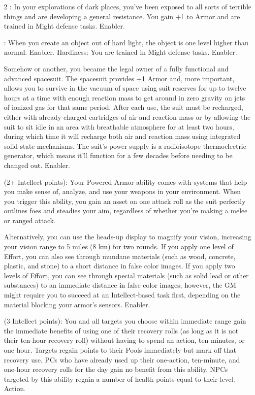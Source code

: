 \begin{multicols}{2}
: In your explorations of dark places, you’ve been exposed to all sorts of terrible things and are developing a general resistance. You gain +1 to Armor and are trained in Might defense tasks. Enabler. 
 
: When you create an object out of hard light, the object is one level higher than normal. Enabler.
Hardiness: You are trained in Might defense tasks. Enabler.
 
 Somehow or another, you became the legal owner of a fully functional and advanced spacesuit. The spacesuit provides +1 Armor and, more important, allows you to survive in the vacuum of space using suit reserves for up to twelve hours at a time with enough reaction mass to get around in zero gravity on jets of ionized gas for that same period. After each use, the suit must be recharged, either with already-charged cartridges of air and reaction mass or by allowing the suit to sit idle in an area with breathable atmosphere for at least two hours, during which time it will recharge both air and reaction mass using integrated solid state mechanisms. The suit’s power supply is a radioisotope thermoelectric generator, which means it’ll function for a few decades before needing to be changed out. Enabler.
 
 (2+ Intellect points): Your Powered Armor ability comes with systems that help you make sense of, analyze, and use your weapons in your environment. When you trigger this ability, you gain an asset on one attack roll as the suit perfectly outlines foes and steadies your aim, regardless of whether you’re making a melee or ranged attack. 

Alternatively, you can use the heads-up display to magnify your vision, increasing your vision range to 5 miles (8 km) for two rounds. If you apply one level of Effort, you can also see through mundane materials (such as wood, concrete, plastic, and stone) to a short distance in false color images. If you apply two levels of Effort, you can see through special materials (such as solid lead or other substances) to an immediate distance in false color images; however, the GM might require you to succeed at an Intellect-based task first, depending on the material blocking your armor’s sensors. Enabler. 
 
 (3 Intellect points): You and all targets you choose within immediate range gain the immediate benefits of using one of their recovery rolls (as long as it is not their ten-hour recovery roll) without having to spend an action, ten minutes, or one hour. Targets regain points to their Pools immediately but mark off that recovery use. PCs who have already used up their one-action, ten-minute, and one-hour recovery rolls for the day gain no benefit from this ability. NPCs targeted by this ability regain a number of health points equal to their level. Action. 
 

\end{multicols}
